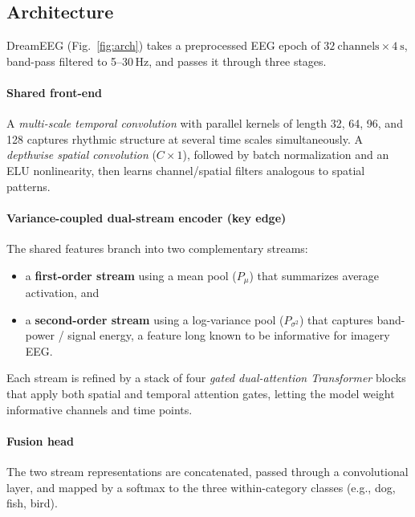 \documentclass[conference]{IEEEtran}
\begin{document}
\subsection{Architecture}
DreamEEG (Fig.~\ref{fig:arch}) takes a preprocessed EEG epoch of
$32\ \text{channels} \times 4\ \text{s}$, band-pass filtered to 5--30\,Hz,
and passes it through three stages.

\paragraph{Shared front-end} A \emph{multi-scale temporal convolution} with
parallel kernels of length 32, 64, 96, and 128 captures rhythmic structure
at several time scales simultaneously. A \emph{depthwise spatial convolution}
($C\times1$), followed by batch normalization and an ELU nonlinearity, then
learns channel/spatial filters analogous to spatial patterns.

\paragraph{Variance-coupled dual-stream encoder (key edge)} The shared
features branch into two complementary streams:
\begin{itemize}
  \item a \textbf{first-order stream} using a mean pool ($P_{\mu}$) that
        summarizes average activation, and
  \item a \textbf{second-order stream} using a log-variance pool
        ($P_{\sigma^2}$) that captures band-power / signal energy, a feature
        long known to be informative for imagery EEG.
\end{itemize}
Each stream is refined by a stack of four \emph{gated dual-attention
Transformer} blocks that apply both spatial and temporal attention gates,
letting the model weight informative channels and time points.

\paragraph{Fusion head} The two stream representations are concatenated,
passed through a convolutional layer, and mapped by a softmax to the three
within-category classes (e.g., dog, fish, bird).
\end{document}

